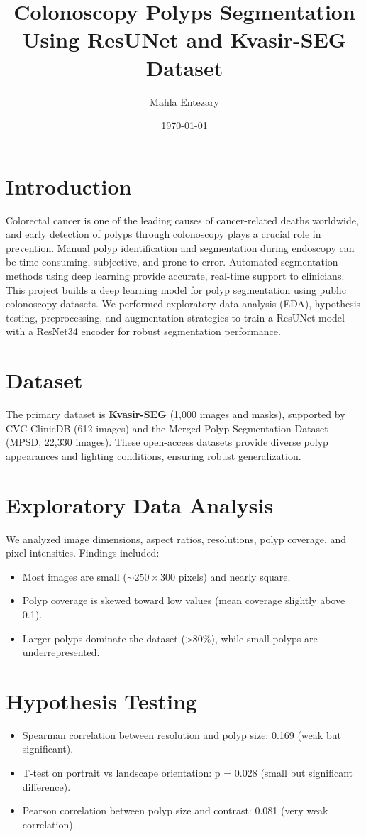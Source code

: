 \documentclass[12pt,a4paper]{article}
\title{\textbf{Colonoscopy Polyps Segmentation Using ResUNet and Kvasir-SEG Dataset}}
\author{Mahla Entezary}
\date{\today}
\begin{document}
\maketitle

\section{Introduction}
Colorectal cancer is one of the leading causes of cancer-related deaths worldwide, and early detection of polyps through colonoscopy plays a crucial role in prevention. Manual polyp identification and segmentation during endoscopy can be time-consuming, subjective, and prone to error. Automated segmentation methods using deep learning provide accurate, real-time support to clinicians.  
This project builds a deep learning model for polyp segmentation using public colonoscopy datasets. We performed exploratory data analysis (EDA), hypothesis testing, preprocessing, and augmentation strategies to train a ResUNet model with a ResNet34 encoder for robust segmentation performance.

\section{Dataset}
The primary dataset is \textbf{Kvasir-SEG} (1,000 images and masks), supported by CVC-ClinicDB (612 images) and the Merged Polyp Segmentation Dataset (MPSD, 22,330 images). These open-access datasets provide diverse polyp appearances and lighting conditions, ensuring robust generalization.

\section{Exploratory Data Analysis}
We analyzed image dimensions, aspect ratios, resolutions, polyp coverage, and pixel intensities. Findings included:
\begin{itemize}
    \item Most images are small (\(\sim250 \times 300\) pixels) and nearly square.
    \item Polyp coverage is skewed toward low values (mean coverage slightly above 0.1).
    \item Larger polyps dominate the dataset (>80\%), while small polyps are underrepresented.
\end{itemize}

\section{Hypothesis Testing}
\begin{itemize}
    \item Spearman correlation between resolution and polyp size: 0.169 (weak but significant).
    \item T-test on portrait vs landscape orientation: p = 0.028 (small but significant difference).
    \item Pearson correlation between polyp size and contrast: 0.081 (very weak correlation).
\end{itemize}
\end{document}
